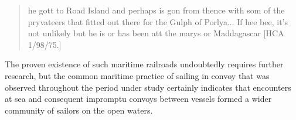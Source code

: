 \begin{quotation}
he gott to Road Island and perhaps is gon from thence with som of the pryvateers that fitted out there for the Gulph of Porlya... If hee bee, it’s not unlikely but he is or has been att the marys or Maddagascar [HCA 1/98/75.] 

\end{quotation}
\begin{styleStandard}
The proven existence of such maritime railroads undoubtedly requires further research, but the common maritime practice of sailing in convoy that was observed throughout the period under study certainly indicates that encounters at sea and consequent impromptu convoys between vessels formed a wider community of sailors on the open waters. 
\end{styleStandard}


